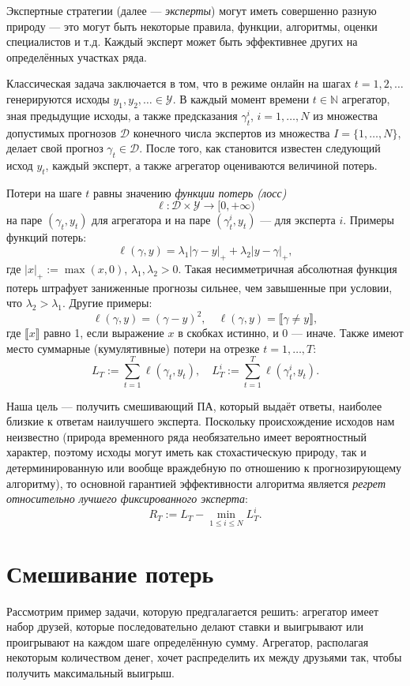 \documentclass[a4paper,12pt]{article}
\newcommand{\N}{\mathbb{N}}
\theoremstyle{plain}
\theoremstyle{definition}
\theoremstyle{remark}
\numberwithin{equation}{section}
\begin{document}
Экспертные стратегии (далее — \textit{эксперты}) могут иметь совершенно разную природу — это могут быть некоторые правила, функции, алгоритмы, оценки специалистов и т.д. Каждый эксперт может быть эффективнее других на определённых участках ряда.

Классическая задача заключается в том, что в режиме онлайн на шагах $t = 1, 2, \dots$ генерируются исходы $y_1, y_2, \dots \in \mathcal{Y}$. 
В каждый момент времени $t \in \N$ агрегатор, зная предыдущие исходы, а также предсказания $\gamma_t^i$, $i = 1, \dots, N$ из множества допустимых прогнозов $\mathcal{D}$ конечного числа экспертов из множества $I = \{1, \dots, N\}$, делает свой прогноз $\gamma_t \in \mathcal{D}$.
После того, как становится известен следующий исход $y_t$, каждый эксперт, а также агрегатор оцениваются величиной потерь.

Потери на шаге $t$ равны значению \textit{функции потерь (лосс)}
\[\ell: \mathcal{D} \times \mathcal{Y} \to [0, +\infty)\]
на паре $(\gamma_t, y_t)$ для агрегатора и на паре $(\gamma_t^i, y_t)$ — для эксперта $i$.
Примеры функций потерь:
\[\ell(\gamma, y) = \lambda_1 |\gamma - y|_+ + \lambda_2 |y - \gamma|_+,\]
где $|x|_+ := \max{(x, 0)}$, $\lambda_1, \lambda_2 > 0$.
Такая несимметричная абсолютная функция потерь штрафует заниженные прогнозы сильнее, чем завышенные при условии, что $\lambda_2 > \lambda_1$. Другие примеры:
\[\ell(\gamma, y) = (\gamma - y)^2, \quad \ell(\gamma, y) = \llbracket \gamma \neq y \rrbracket,\]
где $\llbracket x \rrbracket$ равно 1, если выражение $x$ в скобках истинно, и 0 — иначе.
Также имеют место суммарные (кумулятивные) потери на отрезке $t = 1, \dots, T$:
\[L_T := \sum\limits_{t=1}^{T} \ell(\gamma_t, y_t), \quad L_T^i := \sum\limits_{t=1}^{T} \ell(\gamma_t^i, y_t).\]

Наша цель — получить смешивающий ПА, который выдаёт ответы, наиболее близкие к ответам наилучшего эксперта.
Поскольку происхождение исходов нам неизвестно (природа временного ряда необязательно имеет вероятностный характер, поэтому исходы могут иметь как стохастическую природу, так и детерминированную или вообще враждебную по отношению к прогнозирующему алгоритму), то основной гарантией эффективности алгоритма является \textit{регрет относительно лучшего фиксированного эксперта}:
\[R_T := L_T - \min\limits_{1 \leqslant i \leqslant N} L_T^i.\]


\section{Смешивание потерь}
Рассмотрим пример задачи, которую предгалагается решить: агрегатор имеет набор друзей, которые последовательно делают ставки и выигрывают или проигрывают на каждом шаге определённую сумму. Агрегатор, располагая некоторым количеством денег, хочет распределить их между друзьями так, чтобы получить максимальный выигрыш.
\end{document}
